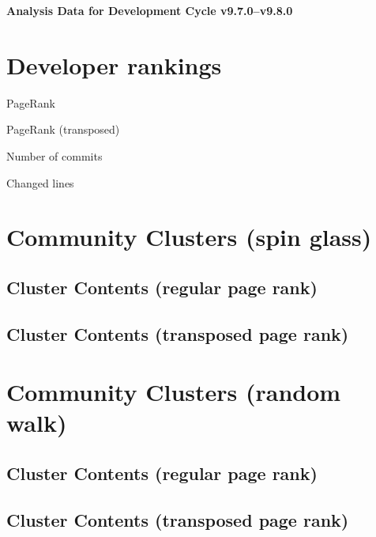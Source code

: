 \documentclass{article}
\begin{document}
\setlength{\parindent}{0pt}
\begin{center}
\begin{Large}
\textbf{Analysis Data for Development Cycle v9.7.0--v9.8.0}
\end{Large}
\end{center}
\section{Developer rankings}
\begin{small}\renewcommand{\tabcolsep}{1pt}
\begin{minipage}{0.5\linewidth}
PageRank\\

\end{minipage}%
\begin{minipage}{0.5\linewidth}
PageRank (transposed)\\

\end{minipage}

\renewcommand{\tabcolsep}{5pt}
\begin{minipage}{0.5\linewidth}
Number of commits\\

\end{minipage}%
\begin{minipage}{0.5\linewidth}
Changed lines\\

\end{minipage}
\end{small}
\newpage\section{Community Clusters (spin glass)}
\subsection{Cluster Contents (regular page rank)}
\newpage\subsection{Cluster Contents (transposed page rank)}
\newpage\section{Community Clusters (random walk)}
\subsection{Cluster Contents (regular page rank)}
\newpage\subsection{Cluster Contents (transposed page rank)}
\end{document}

